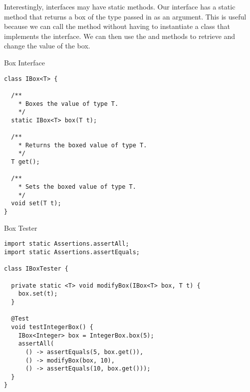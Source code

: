 

Interestingly, interfaces may have static methods. Our  interface has a static  method that returns a box of the type passed in as an argument. This is useful because we can call the  method without having to instantiate a class that implements the  interface. We can then use the  and  methods to retrieve and change the value of the box.

\begin{cl}{Box Interface}
\begin{lstlisting}[language=MyJava]
class IBox<T> {
  
  /**
    * Boxes the value of type T.
    */
  static IBox<T> box(T t);

  /**
    * Returns the boxed value of type T.
    */
  T get();

  /**
    * Sets the boxed value of type T.
    */
  void set(T t);
}
\end{lstlisting}
\end{cl}

\begin{cl}{Box Tester} 
\begin{lstlisting}[language=MyJava]
import static Assertions.assertAll;
import static Assertions.assertEquals;

class IBoxTester {

  private static <T> void modifyBox(IBox<T> box, T t) {
    box.set(t);
  }
  
  @Test
  void testIntegerBox() {
    IBox<Integer> box = IntegerBox.box(5);
    assertAll(
      () -> assertEquals(5, box.get()),
      () -> modifyBox(box, 10),
      () -> assertEquals(10, box.get()));
  }
}
\end{lstlisting}
\end{cl}

